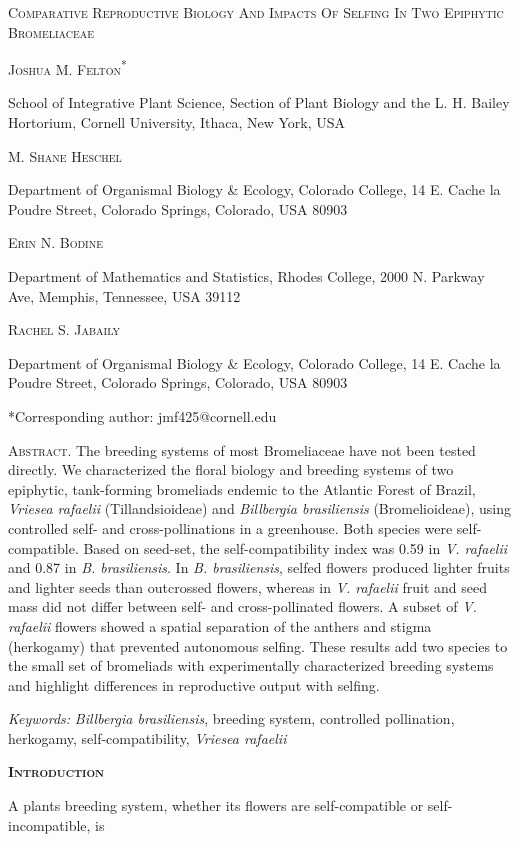 \documentclass[
]{article}
\author{}
\date{}
\begin{document}
\textsc{Comparative Reproductive Biology And Impacts Of Selfing In Two
Epiphytic Bromeliaceae}

\textsc{Joshua M. Felton\textsuperscript{*}}

School of Integrative Plant Science, Section of Plant Biology and the L.
H. Bailey Hortorium, Cornell University, Ithaca, New York, USA

\textsc{M. Shane Heschel}

Department of Organismal Biology \& Ecology, Colorado College, 14 E.
Cache la Poudre Street, Colorado Springs, Colorado, USA 80903

\textsc{Erin N. Bodine}

Department of Mathematics and Statistics, Rhodes College, 2000 N.
Parkway Ave, Memphis, Tennessee, USA 39112

\textsc{Rachel S. Jabaily}

Department of Organismal Biology \& Ecology, Colorado College, 14 E.
Cache la Poudre Street, Colorado Springs, Colorado, USA 80903

*Corresponding author: jmf425@cornell.edu

\textsc{Abstract.} The breeding systems of most Bromeliaceae have not
been tested directly. We characterized the floral biology and breeding
systems of two epiphytic, tank-forming bromeliads endemic to the
Atlantic Forest of Brazil, \emph{Vriesea rafaelii} (Tillandsioideae) and
\emph{Billbergia brasiliensis} (Bromelioideae), using controlled self-
and cross-pollinations in a greenhouse. Both species were
self-compatible. Based on seed-set, the self-compatibility index was
0.59 in \emph{V. rafaelii} and 0.87 in \emph{B. brasiliensis}. In
\emph{B. brasiliensis}, selfed flowers produced lighter fruits and
lighter seeds than outcrossed flowers, whereas in \emph{V. rafaelii}
fruit and seed mass did not differ between self- and cross-pollinated
flowers. A subset of \emph{V. rafaelii} flowers showed a spatial
separation of the anthers and stigma (herkogamy) that prevented
autonomous selfing. These results add two species to the small set of
bromeliads with experimentally characterized breeding systems and
highlight differences in reproductive output with selfing.

\emph{Keywords:} \emph{Billbergia brasiliensis}, breeding system,
controlled pollination, herkogamy, self-compatibility, \emph{Vriesea
rafaelii}

\textbf{\textsc{Introduction}}

A plant\textquotesingle s breeding system, whether its flowers are
self-compatible or self-incompatible, is
\end{document}
